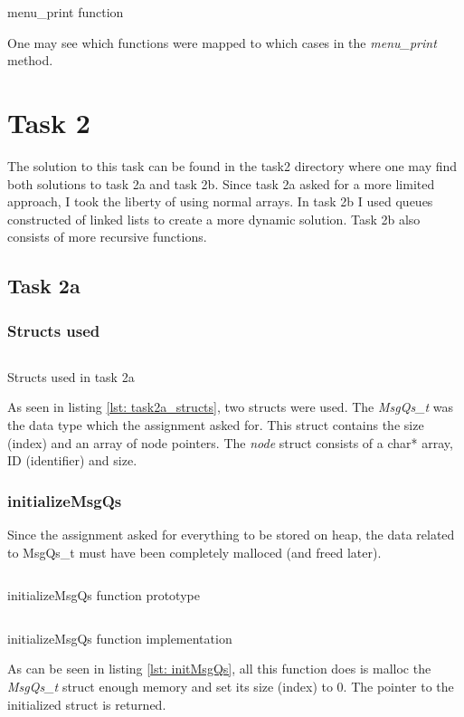 \documentclass[a4paper, 12pt, titlepage]{article}
\newenvironment{code}{\captionsetup{type=listing}}{}
\newcommand{\sourcecode}[3]{
    \begin{code}
      \inputminted[linenos,numbersep=5pt,gobble=0,frame=lines,framesep=2mm,]{c}{#1}
        \caption{#2}
        \label{lst: #3}
    \end{code}
  }
\begin{document}
\begin{onehalfspacing}
  \sourcecode{snippets/menu_print.c}{menu\_print function}{menu_print}

  One may see which functions were mapped to which cases in the \emph{menu\_print} method.


  \clearpage

  \section{Task 2}
  The solution to this task can be found in the task2 directory where one may find both solutions to task 2a and task 2b. Since task 2a asked for a more limited approach, I took the liberty of using normal arrays. In task 2b I used queues constructed of linked lists to create a more dynamic solution. Task 2b also consists of more recursive functions.

  \subsection{Task 2a}
  \subsubsection{Structs used}

  \sourcecode{snippets/task2a_struct.c}{Structs used in task 2a}{task2a_structs}

  As seen in listing \ref{lst: task2a_structs}, two structs were used. The \emph{MsgQs\_t} was the data type which the assignment asked for. This struct contains the size (index) and an array of node pointers. The \emph{node} struct consists of a char* array, ID (identifier) and size.

  \clearpage

  \subsubsection{initializeMsgQs}
  Since the assignment asked for everything to be stored on heap, the data related to MsgQs\_t must have been completely malloced (and freed later).

  \sourcecode{snippets/initMsgQs_header.c}{initializeMsgQs function prototype}{initMsgQs_header}

  \sourcecode{snippets/initMsgQs.c}{initializeMsgQs function implementation}{initMsgQs}

  As can be seen in listing \ref{lst: initMsgQs}, all this function does is malloc the \emph{MsgQs\_t} struct enough memory and set its size (index) to 0. The pointer to the initialized struct is returned.


\end{onehalfspacing}
\end{document}
